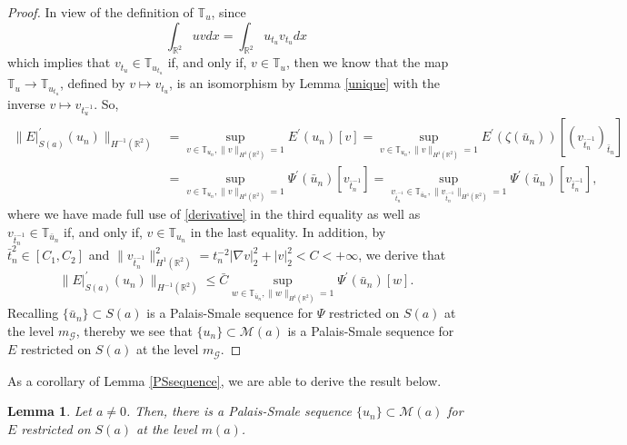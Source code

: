 \documentclass[11pt]{amsart}
\numberwithin{equation}{section}
\newtheorem{lemma}[theorem]{Lemma}
\theoremstyle{definition}
\newcommand{\R}{\mathbb{R}}
\begin{document}
\begin{proof}
In view of the definition of $\mathbb{T}_u$, since
\[
\int_{\R^2}uvdx=\int_{\R^2}u_{t_u}v_{t_u}dx
\]
which implies that $v_{t_u}\in \mathbb{T}_{u_{t_u}}$ if, and only if, $v\in \mathbb{T}_u$,
then we know that the map $\mathbb{T}_u\to \mathbb{T}_{u_{t_u}}$, defined by $v\mapsto v_{t_u}$,
is an isomorphism by Lemma \ref{unique} with the inverse $v\mapsto v_{t_u^{-1}}$.
So,
\begin{align*}
  \|E|_{S(a)}^\prime(u_n)\|_{H^{-1}(\R^2)}  &=\sup_{v\in \mathbb{T}_{u_n},\|v\|_{H^1(\R^2)}=1}E^\prime(u_n)[v]
=\sup_{v\in \mathbb{T}_{u_n},\|v\|_{H^1(\R^2)}=1}E^\prime(\zeta(\bar{u}_n))[(v_{\bar{t}_n^{-1}})_{\bar{t}_n}]  \\
    &  =\sup_{v\in \mathbb{T}_{u_n},\|v\|_{H^1(\R^2)}=1}\Psi^\prime ( \bar{u}_n )[ v_{\bar{t}_n^{-1}}]
=\sup_{v_{\bar{t}_n^{-1}}\in \mathbb{T}_{\bar{u}_n},\|v_{\bar{t}_n^{-1}}\|_{H^1(\R^2)}=1}\Psi^\prime ( \bar{u}_n )[ v_{\bar{t}_n^{-1}}],
\end{align*}
where we have made full use of \eqref{derivative} in the third equality as well as
$v_{\bar{t}_n^{-1}}\in \mathbb{T}_{\bar{u}_n}$ if, and only if, $v\in \mathbb{T}_{u_n}$ in the last equality.
In addition, by $\bar{t}_n^2\in[C_1,C_2]$
and $\|v_{\bar{t}_n^{-1}}\|_{H^1(\R^2)}^2=t_n^{-2}|\nabla v|_2^2+|v|_2^2< C<+\infty$,
we derive that
\[
\|E|_{S(a)}^\prime(u_n)\|_{H^{-1}(\R^2)}\leq \bar{C}
\sup_{w\in \mathbb{T}_{\bar{u}_n},\|w\|_{H^1(\R^2)}=1}\Psi^\prime ( \bar{u}_n )[w].
\]
Recalling $\{\bar{u}_n\}\subset S(a)$ is a Palais-Smale sequence for $\Psi$ restricted on $S(a)$
at the level $m_\mathcal{G}$, thereby we see that $\{u_n\}\subset \mathcal{M}(a)$ is a Palais-Smale sequence for $E$ restricted on $S(a)$
at the level $m_\mathcal{G}$.
\end{proof}

As a corollary of Lemma \ref{PSsequence}, we are able to derive the result below.

\begin{lemma}\label{2PSsequence}
Let $a\neq0$. Then, there is a Palais-Smale sequence $\{u_n\}\subset \mathcal{M}(a)$ for $E$ restricted on $S(a)$
at the level $m(a)$.
\end{lemma}
\end{document}

